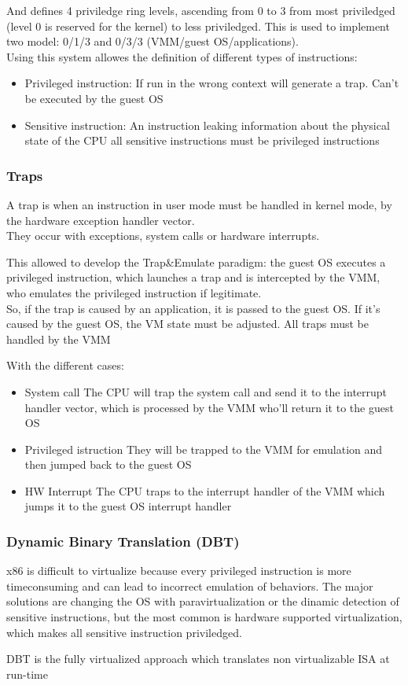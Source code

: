 \documentclass[12pt, a4paper]{article}
\begin{document}
And defines 4 priviledge ring levels, ascending from 0 to 3 from most priviledged (level 0 is reserved for the kernel)
to less priviledged. This is used to implement two model: 0/1/3 and 0/3/3 (VMM/guest OS/applications).\\
Using this system allowes the definition of different types of instructions:
\begin{itemize}
    \item Privileged instruction: If run in the wrong context will generate a trap. Can't be executed by the guest OS
    \item Sensitive instruction: An instruction leaking information about the physical state of the CPU
    \subitem all sensitive instructions must be privileged instructions
\end{itemize}

\subsubsection{Traps}
A trap is when an instruction in user mode must be handled in kernel mode, by the hardware exception handler vector.\\
They occur with exceptions, system calls or hardware interrupts.

This allowed to develop the Trap\&Emulate paradigm: the guest OS executes a privileged instruction, which launches
a trap and is intercepted by the VMM, who emulates the privileged instruction if legitimate.\\So, if the trap is 
caused by an application, it is passed to the guest OS. If it's caused by the guest OS, the VM state must be 
adjusted. All traps must be handled by the VMM

With the different cases:
\begin{itemize}
    \item System call
    \subitem The CPU will trap the system call and send it to the interrupt handler vector, which is processed by 
    the VMM who'll return it to the guest OS
    \item Privileged istruction
    \subitem They will be trapped to the VMM for emulation and then jumped back to the guest OS
    \item HW Interrupt
    \subitem The CPU traps to the interrupt handler of the VMM which jumps it to the guest OS interrupt handler
\end{itemize}

\subsubsection{Dynamic Binary Translation (DBT)}
x86 is difficult to virtualize because every privileged instruction is more timeconsuming and can lead to incorrect 
emulation of behaviors. The major solutions are changing the OS with paravirtualization or the dinamic detection of
sensitive instructions, but the most common is hardware supported virtualization, which makes all sensitive 
instruction priviledged.

DBT is the fully virtualized approach which translates non virtualizable ISA  at run-time 
\end{document}
